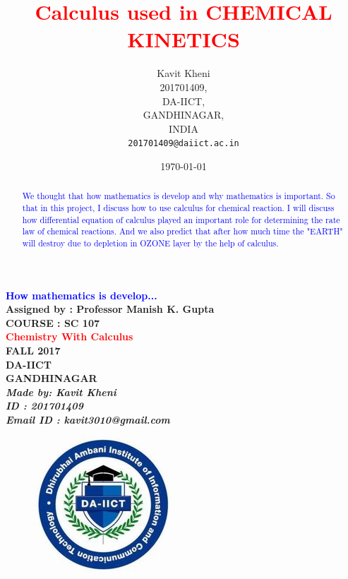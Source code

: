 \documentclass[12pt]{article}
\begin{document}


\title{\textcolor{red}{Calculus used in CHEMICAL KINETICS}}

\begin{center}
\Huge
{\bf \textcolor{blue}
{ 
{How mathematics is develop...} \\
}
}
\vspace{2 cm}
\huge\bf
{ Assigned by : Professor Manish K. Gupta \\
COURSE : SC 107 \\
{\bf \textcolor{red}
{
{Chemistry With Calculus} \\
}
FALL 2017 \\
DA-IICT \\
GANDHINAGAR \\
}
\vspace{6 cm}
\LARGE {\it
{ 
Made by: Kavit Kheni \\
ID : 201701409 \\
Email ID : kavit3010@gmail.com\\
}
}
}
\end{center}

\author{
Kavit Kheni\\
201701409,\\
DA-IICT,\\
GANDHINAGAR,\\
INDIA\\
\texttt{201701409@daiict.ac.in}
} 
\date{\today}

\maketitle
\begin{abstract}
\textcolor{blue}
{
\large
{
     We thought that how mathematics is develop and why mathematics is important. So that in this project, I discuss how to use calculus for chemical reaction. I will discuss how differential equation  of calculus played an important role for determining the rate law of chemical reactions.
		And we also predict that after how much time the "EARTH" will destroy due to depletion in OZONE layer by the help of calculus.
}
}
\end{abstract}




\begin{figure}[h!]
\centering
\includegraphics[scale=3]{DA-IICT.jpg}
\end{figure}
\end{document}
